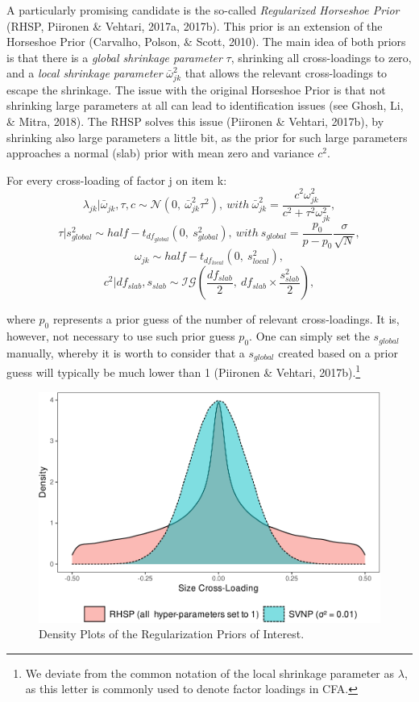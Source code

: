 \documentclass[
  man,floatsintext]{apa6}
\begin{document}
A particularly promising candidate is the so-called \emph{Regularized Horseshoe Prior} (RHSP, Piironen \& Vehtari, 2017a, 2017b). This prior is an extension of the Horseshoe Prior (Carvalho, Polson, \& Scott, 2010). The main idea of both priors is that there is a \emph{global shrinkage parameter} \(\tau\), shrinking all cross-loadings to zero, and a \emph{local shrinkage parameter} \(\bar{\omega}_{jk}^2\) that allows the relevant cross-loadings to escape the shrinkage. The issue with the original Horseshoe Prior is that not shrinking large parameters at all can lead to identification issues (see Ghosh, Li, \& Mitra, 2018). The RHSP solves this issue (Piironen \& Vehtari, 2017b), by shrinking also large parameters a little bit, as the prior for such large parameters approaches a normal (slab) prior with mean zero and variance \(c^2\).

For every cross-loading of factor j on item k:
\[\lambda_{jk} | \bar{\omega}_{jk}, \tau, c\sim \mathcal{N}(0, \ \bar{\omega}^2_{jk} \tau^2), \ with \ \bar{\omega}^2_{jk} = \frac{c^2\omega_{jk}^2}{c^2 + \tau^2 \omega_{jk}^2},\]
\[\tau | s_{global}^2 \sim half-t_{df_{global}}(0,\  s_{global}^2), \ with \  s_{global} = \frac{p_0}{p-p_0}\frac{\sigma}{\sqrt{N}},\]
\[\omega_{jk} \sim half-t_{df_{local}}(0, \ s_{local}^2),\]
\[c^2 | df_{slab}, s_{slab} \sim \mathcal{IG}(\frac{df_{slab}}{2}, \  df_{slab} \times \frac{s_{slab}^2}{2}),\]

where \(p_0\) represents a prior guess of the number of relevant cross-loadings. It is, however, not necessary to use such prior guess \(p_0\). One can simply set the \(s_{global}\) manually, whereby it is worth to consider that a \(s_{global}\) created based on a prior guess will typically be much lower than 1 (Piironen \& Vehtari, 2017b).\footnote{We deviate from the common notation of the local shrinkage parameter as \(\lambda\), as this letter is commonly used to denote factor loadings in CFA.}

\begin{figure}
\centering
\includegraphics{JMBKoch_report_files/figure-latex/unnamed-chunk-1-1.pdf}
\caption{\label{fig:unnamed-chunk-1}Density Plots of the Regularization Priors of Interest.}
\end{figure}
\end{document}

